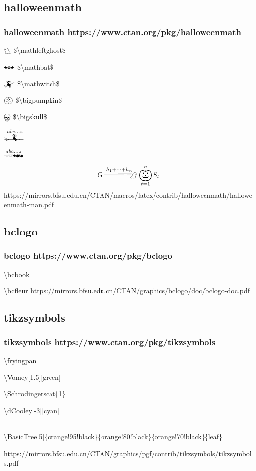 \documentclass[xetex, mathserif, UTF8]{beamer}
\begin{document}
\subsection{halloweenmath}\label{sec:halloween}
\begin{frame}
  \frametitle{halloweenmath https://www.ctan.org/pkg/halloweenmath}
  $\mathleftghost$ \quad \$\textbackslash mathleftghost\$

  $\mathbat$ \quad \$\textbackslash mathbat\$

  $\mathwitch$ \quad \$\textbackslash mathwitch\$

  $\bigpumpkin$ \quad \$\textbackslash bigpumpkin\$

  $\bigskull$ \quad \$\textbackslash bigskull\$

  $\xrightwitchonbroom{abc\dots z}$

  $\xrightflutteringbat{abc\dots z}$

  \begin{align*}
    G \xrightswishingghost{h_{1}+\dots+h_{n}}\bigpumpkin_{t=1}^{n} S_{t}
  \end{align*}
  https://mirrors.bfsu.edu.cn/CTAN/macros/latex/contrib/halloweenmath/halloweenmath-man.pdf
\end{frame}

\subsection{bclogo}\label{sec:bclogo}
\begin{frame}
  \frametitle{bclogo https://www.ctan.org/pkg/bclogo}
  \bcbook \quad \textbackslash bcbook

  \bcfleur \quad \textbackslash bcfleur
  https://mirrors.bfsu.edu.cn/CTAN/graphics/bclogo/doc/bclogo-doc.pdf
\end{frame}


\subsection{tikzsymbols}\label{sec:tikzsymbols}
\begin{frame}
  \frametitle{tikzsymbols https://www.ctan.org/pkg/tikzsymbols}
  \fryingpan \quad \textbackslash fryingpan

  \Vomey[1.5][green] \quad \textbackslash Vomey[1.5][green]

   \quad \textbackslash Schrodingerscat\{1\}

  \dCooley[-3][cyan] \quad \textbackslash dCooley[-3][cyan]

   \\
  \textbackslash BasicTree[5]\{orange!95!black\}\{orange!80!black\}\{orange!70!black\}\{leaf\}

  https://mirrors.bfsu.edu.cn/CTAN/graphics/pgf/contrib/tikzsymbols/tikzsymbols.pdf
\end{frame}
\end{document}
